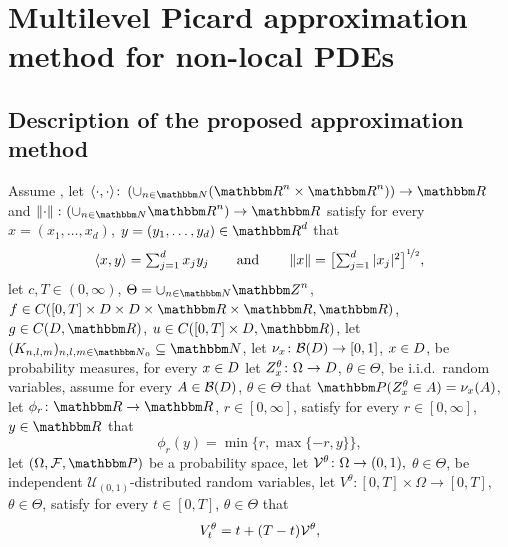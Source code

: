 \section{Multilevel Picard approximation method for non-local PDEs}
\label{sec:MLP}
\subsection{Description of the proposed approximation method}
\begin{algo}\label{frame:mlpsetting}
	Assume ,
	let
	$\langle\cdot,\cdot \rangle \colon \left( \cup_{n\in\N} (\R^n \times \R^n)\right) \to \R$
	and
	$\norm{\cdot} \colon (\cup_{n\in\N} \R^n) \to \R$
	satisfy for every
	$x = ( x_1, \dots, x_{d} )$,
	$y = (y_1,\dots,y_d) \in \R^{d} $
	that
	\begin{equation}
	\langle x,y\rangle  = \textstyle\sum\nolimits_{j=1}^d x_j y_j
				\qquad \text{and} \qquad 
	\left\| x \right\| = \bigl[\textstyle\sum\nolimits_{j=1}^d \vert x_j\vert^2\bigr]^{\nicefrac{1}{2}},
	\end{equation}
	let
	$c,T\in (0,\infty)$, 
	$\Theta = \cup_{n\in \N} \Z^n$, 
	$f \in C([0,T]\times D \times D \times \R \times \R,\R)$, 
	$g\in C(D,\R)$, 
	$u \in C([0,T]\times \D, \R)$, 
	let
	$(K_{n,l,m})_{n,l,m\in \N_0} \subseteq \N$,
	let
	$\nu_x \colon \mathcal{B}( D )\to [0,1]$,
	$x \in D$,
	be probability measures, 
	for every
	$x \in D$
	let
	$ {Z}^{\theta }_{ x } \colon \Omega \to D $,
	$\theta \in \Theta$,
	be i.i.d.\ random variables, 
	assume for every
	$ A \in \mathcal{B}( D ) $,
	$\theta \in \Theta$
	that
	$\P( \Zz_{ x }^{ \theta } \in A ) = \nu_x( A )$,
	let 
	$ \phi_r \colon \R \rightarrow \R$,
	$r\in [0,\infty]$, 
	satisfy for every 
	$r\in [0,\infty]$, 
	$y \in \R$ 
	that
	\begin{equation}
		\phi_r(y) = \min\{r,\max\{-r,y\}\},
	\end{equation}
	let $(\Omega,\mathcal{F}, \P)$ be a probability space,
	let ${\mathcal{V}}^\theta\colon \Omega \rightarrow (0,1),$ $\theta \in \Theta$, be independent $\mathcal{U}_{(0,1)}$-distributed random variables, 
	let  $V^\theta\colon [0,T]\times \Omega \rightarrow [0,T]$, $\theta \in \Theta$, 
	satisfy for every $t\in [0,T]$, $\theta \in \Theta$ 
	that 
	\begin{equation}
		V^\theta_{t} = t+ (T-t){\mathcal{V}}^\theta,
	\end{equation} 

\end{algo}
